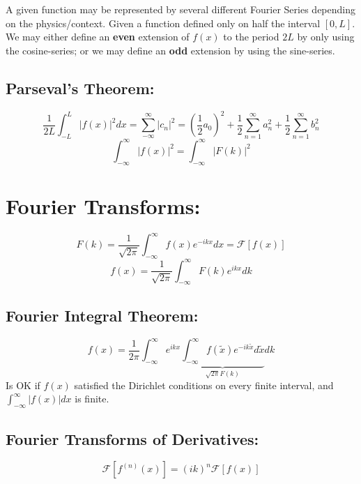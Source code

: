 \documentclass[a4paper,norsk, 10pt]{article}
\begin{document}
A given function may be represented by several different Fourier Series depending on the physics/context. Given a function defined only on half the interval $[0,L]$. We may either define an \textbf{even} extension of $f(x)$ to the period $2L$ by only using the cosine-series; or we may define an \textbf{odd} extension by using the sine-series.

\subsection{Parseval's Theorem:}
\begin{equation}
\frac{1}{2L}\int_{-L}^L |f(x)|^2dx = \sum_{-\infty}^{\infty}|c_n|^2 = \left(\frac{1}{2}a_0\right)^2 + \frac{1}{2}\sum_{n=1}^{\infty}a_n^2 + \frac{1}{2}\sum_{n=1}^{\infty}b_n^2
\end{equation}
\begin{equation}
\int_{-\infty}^{\infty}|f(x)|^2 = \int_{-\infty}^{\infty}|F(k)|^2 
\end{equation}

\section{Fourier Transforms:}
\begin{equation}
F(k) = \frac{1}{\sqrt{2\pi}}\int_{-\infty}^{\infty} f(x) e^{-ikx} dx = \mathcal{F}[f(x)]
\end{equation}
\begin{equation}
f(x) = \frac{1}{\sqrt{2\pi}}\int_{-\infty}^{\infty} F(k) e^{ikx} dk
\end{equation}
\subsection{Fourier Integral Theorem:}
\begin{equation}
f(x) = \frac{1}{2\pi}\int_{-\infty}^{\infty}e^{ikx}\underbrace{\int_{-\infty}^{\infty}f(\tilde{x}) e^{-ik\tilde{x}}d\tilde{x}}_{\sqrt{2\pi}F(k)}dk
\end{equation}
Is OK if $f(x)$ satisfied the Dirichlet conditions on every finite interval, and $\int_{-\infty}^{\infty}|f(x)|dx$ is finite.

\subsection{Fourier Transforms of Derivatives:}
\begin{equation}
\mathcal{F}[f^{(n)}(x)] = (ik)^n\mathcal{F}[f(x)]
\end{equation}
\end{document}
